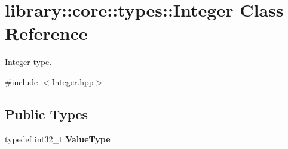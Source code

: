 \hypertarget{classlibrary_1_1core_1_1types_1_1_integer}{}\section{library\+:\+:core\+:\+:types\+:\+:Integer Class Reference}
\label{classlibrary_1_1core_1_1types_1_1_integer}


\hyperlink{classlibrary_1_1core_1_1types_1_1_integer}{Integer} type.  




{\ttfamily \#include $<$Integer.\+hpp$>$}

\subsection*{Public Types}
\begin{DoxyCompactItemize}
\item 
\mbox{\label{classlibrary_1_1core_1_1types_1_1_integer_a623afb1580f870fd8a1997b1c12c917d}} 
typedef int32\+\_\+t {\bfseries Value\+Type}
\end{DoxyCompactItemize}
